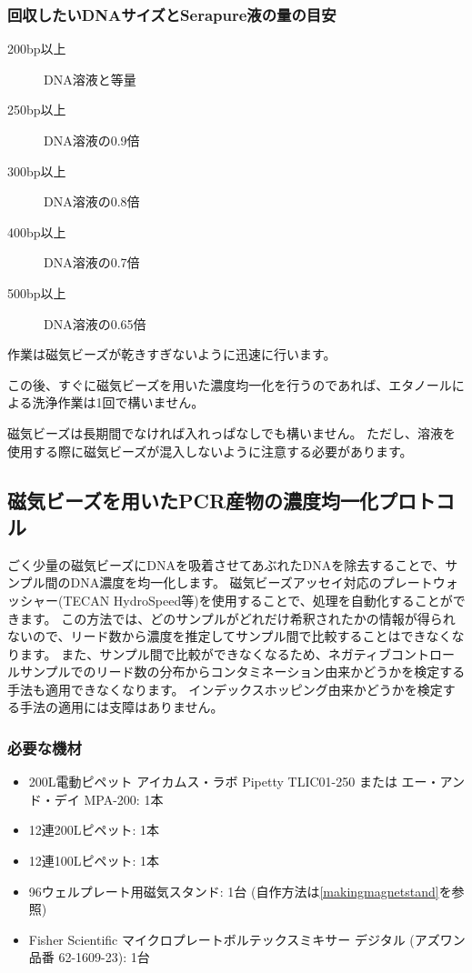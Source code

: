 \documentclass[titlepage,10pt,a4paper,uplatex]{jsbook}
\begin{document}
\subsubsection{回収したいDNAサイズとSerapure液の量の目安}
\begin{description}
\item[200bp以上] DNA溶液と等量
\item[250bp以上] DNA溶液の0.9倍
\item[300bp以上] DNA溶液の0.8倍
\item[400bp以上] DNA溶液の0.7倍
\item[500bp以上] DNA溶液の0.65倍
\end{description}

作業は磁気ビーズが乾きすぎないように迅速に行います。

この後、すぐに磁気ビーズを用いた濃度均一化を行うのであれば、エタノールによる洗浄作業は1回で構いません。

磁気ビーズは長期間でなければ入れっぱなしでも構いません。
ただし、溶液を使用する際に磁気ビーズが混入しないように注意する必要があります。

\subsection{磁気ビーズを用いたPCR産物の濃度均一化プロトコル}

ごく少量の磁気ビーズにDNAを吸着させてあぶれたDNAを除去することで、サンプル間のDNA濃度を均一化します。
磁気ビーズアッセイ対応のプレートウォッシャー(TECAN HydroSpeed等)を使用することで、処理を自動化することができます。
この方法では、どのサンプルがどれだけ希釈されたかの情報が得られないので、リード数から濃度を推定してサンプル間で比較することはできなくなります。
また、サンプル間で比較ができなくなるため、ネガティブコントロールサンプルでのリード数の分布からコンタミネーション由来かどうかを検定する手法も適用できなくなります。
インデックスホッピング由来かどうかを検定する手法の適用には支障はありません。

\subsubsection{必要な機材}
\begin{itemize}
\item 200{\textmu}L電動ピペット アイカムス・ラボ Pipetty TLIC01-250 または エー・アンド・デイ MPA-200: 1本
\item 12連200{\textmu}Lピペット: 1本
\item 12連100{\textmu}Lピペット: 1本
\item 96ウェルプレート用磁気スタンド: 1台 (自作方法は\ref{makingmagnetstand}を参照)
\item Fisher Scientific マイクロプレートボルテックスミキサー デジタル (アズワン品番 62-1609-23): 1台
\end{itemize}
\end{document}
